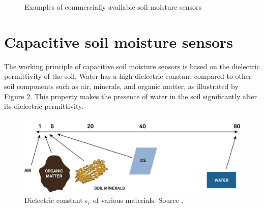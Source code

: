 \begin{figure}
    \hfil
    \caption{\label{fig:satellite}Examples of commercially available soil moisture sensors \cite{meter_group_teros_nodate, baseline_soil_2021, czechproject_spol_sro_pudni_2024}}
\end{figure}

\section{\label{section:soil-moisure-sensors-theory}Capacitive soil moisture sensors}
The working principle of capacitive soil moisture sensors is based on the dielectric permittivity of the soil. Water has a high dielectric constant compared to other soil components such as air, minerals, and organic matter, as illustrated by Figure \ref{fig:dielectric-constant}. This property makes the presence of water in the soil significantly alter its dielectric permittivity.

\begin{figure}
    \includegraphics[width=.7\textwidth]{fig/dielectric-constant.jpg}
    \caption{\label{fig:dielectric-constant}Dielectric constant $\epsilon_r$ of various materials. Source \cite{meter_group_soil_2023}.}
\end{figure}

